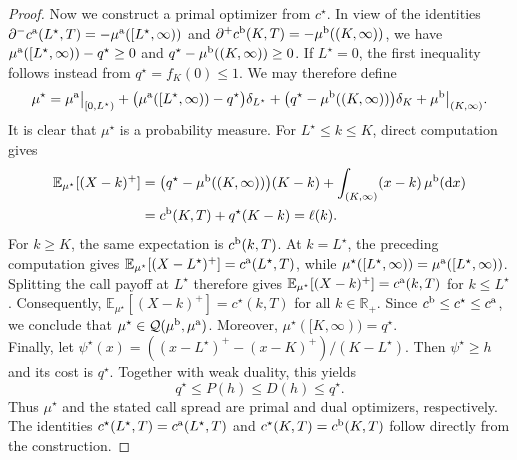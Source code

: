 \documentclass[11pt]{article}
\newcommand{\cQ}{\mathcal{Q}}
\newcommand{\R}{\mathbb{R}} %
\theoremstyle{plain}
\theoremstyle{definition}
\theoremstyle{remark}
\newcommand{\E}{\mathbb{E}}
\newcommand*{\rd}{\mathrm{d}}
\theoremstyle{plain}
\begin{document}
\begin{proof}
Now we construct a primal optimizer from $c^\star$. In view of the identities
$\partial^-c^{\rm a}(L^\star,T)
=-\mu^{\rm a}([L^\star,\infty))$ and
$\partial^+c^{\rm b}(K,T)
=-\mu^{\rm b}((K,\infty))$, we have $\mu^{\rm a}([L^\star,\infty))-q^\star\ge0$ and
$q^\star-\mu^{\rm b}((K,\infty))\ge0$. If $L^\star=0$, the first
inequality follows instead from $q^\star = f_K(0)\le1$. We may
therefore define
\[
\mu^\star
=
\mu^{\rm a}\big|_{[0,L^\star)}
+\big(\mu^{\rm a}([L^\star,\infty))-q^\star\big)\delta_{L^\star}
+\big(q^\star-\mu^{\rm b}((K,\infty))\big)\delta_K
+\mu^{\rm b}\big|_{(K,\infty)}.
\]
It is clear that $\mu^\star$ is a probability
measure. For $L^\star\le k\le K$, direct computation gives
\[
\begin{aligned}
\E_{\mu^\star}[(X-k)^+]
&=\big(q^\star-\mu^{\rm b}((K,\infty))\big)(K-k)
  +\int_{(K,\infty)}(x-k)\,\mu^{\rm b}(\rd x)\\
&=c^{\rm b}(K,T)+q^\star(K-k)=\ell(k).
\end{aligned}
\]
For $k\ge K$, the same expectation is $c^{\rm b}(k,T)$. At
$k=L^\star$, the preceding computation gives
$\E_{\mu^\star}[(X-L^\star)^+]=c^{\rm a}(L^\star,T)$, while
$\mu^\star([L^\star,\infty))
=\mu^{\rm a}([L^\star,\infty))$. Splitting the call payoff at
$L^\star$ therefore gives
$\E_{\mu^\star}[(X-k)^+]=c^{\rm a}(k,T)$ for $k\le L^\star$.
Consequently,
$\E_{\mu^\star}[(X-k)^+]=c^\star(k,T)$ for all $k\in\R_+$.
Since $c^{\rm b}\le c^\star\le c^{\rm a}$, we conclude that
$\mu^\star\in\cQ(\mu^{\rm b},\mu^{\rm a})$. Moreover,
$\mu^\star([K,\infty))=q^\star$.
\\
Finally, let
$\psi^\star(x)=((x-L^\star)^+-(x-K)^+)/(K-L^\star)$. Then
$\psi^\star\ge h$ and its cost is $q^\star$. Together with weak
duality, this yields
\[
q^\star\le P(h)\le D(h)\le q^\star.
\]
Thus $\mu^\star$ and the stated call spread are primal and dual
optimizers, respectively. The identities
$c^\star(L^\star,T)=c^{\rm a}(L^\star,T)$ and
$c^\star(K,T)=c^{\rm b}(K,T)$ follow directly from the construction.
\end{proof}
\end{document}
